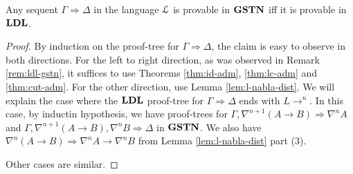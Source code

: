 \begin{thm}\label{thm:ldl-eq-gstn}
  Any sequent $\Gamma \Rightarrow \Delta$ in the language $\L$ is provable in $\GSTN$ iff it is provable in $\LDL$.
\end{thm}
\begin{proof}
  By induction on the proof-tree for $\Gamma \Rightarrow \Delta$, the claim is easy to observe in both directions. For the left to right direction, as was observed in Remark \ref{rem:ldl-gstn}, it suffices to use Theorems \ref{thm:id-adm}, \ref{thm:lc-adm} and \ref{thm:cut-adm}. For the other direction, use Lemma \ref{lem:l-nabla-dist}. We will explain the case where the $\LDL$ proof-tree for $\Gamma \Rightarrow \Delta$ ends with $L \rightarrow ^n$. In this case, by inductin hypothesis, we have proof-trees for $\Gamma, \nabla^{n+1} (A \rightarrow B) \Rightarrow \nabla^n A$ and $\Gamma, \nabla^{n+1} (A \rightarrow B), \nabla^n B \Rightarrow \Delta$ in $\GSTN$. We also have $\nabla^n (A \rightarrow B) \Rightarrow \nabla^n A \rightarrow \nabla^n B$ from Lemma \ref{lem:l-nabla-dist} part (3).

  \begin{prooftree}


  \end{prooftree}

  Other cases are similar.
\end{proof}